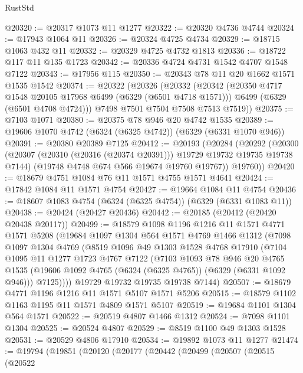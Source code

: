 \begin{lexlean}{RustStd}
\begin{coremodule}
{{@20320 := @20317 @1073 @11 @1277
@20322 := @20320 @4736 @4744
@20324 := @17943 @1064 @11
@20326 := @20324 @4725 @4734
@20329 := @18715 @1063 @432 @11
@20332 := @20329 @4725 @4732 @1813
@20336 := @18722 @117 @11 @135 @1723
@20342 := @20336 @4724 @4731 @1542 @4707 @1548 @7122
@20343 := @17956 @115
@20350 := @20343 @78 @11 @20 @1662 @1571 @1535 @1542
@20374 := @20322
    (@20326
      (@20332
        (@20342
          (@20350 @4717 @1548 @20105 @17968 @6499 (@6329 (@6501 @4718 @1571)))
          @6499
          (@6329 (@6501 @4708 @4724)))
        @7498
        @7501
        @7504
        @7508
        @7513
        @7519))
@20375 := @7103 @1071
@20380 := @20375 @78 @946 @20 @4742 @1535
@20389 := @19606 @1070 @4742 (@6324 (@6325 @4742)) (@6329 (@6331 @1070 @946))
@20391 := @20380 @20389 @7125
@20412 := @20193
    (@20284
      (@20292
        (@20300
          (@20307 (@20310 (@20316 (@20374 @20391))) @19729 @19732 @19735 @19738 @7144)
          (@19748 @4748 @674 @566 @19674 @19760 @19767))
        @19760))
@20420 := @18679 @4751 @1084 @76 @11 @1571 @4755 @1571 @4641
@20424 := @17842 @1084 @11 @1571 @4754
@20427 := @19664 @1084 @11 @4754
@20436 := @18607 @1083 @4754 (@6324 (@6325 @4754)) (@6329 (@6331 @1083 @11))
@20438 := @20424 (@20427 @20436)
@20442 := @20185 (@20412 (@20420 @20438 @20117))
@20499 := @18579
    @1098
    @1196
    @1216
    @11
    @1571
    @4771
    @1571
    @5208
    (@19684
      @1097
      @1304
      @564
      @1571
      @4769
      @1466
      @1312
      (@7098
        @1097
        @1304
        @4769
        (@8519
          @1096
          @49
          @1303
          @1528
          @4768
          @17910
          (@7104
            @1095
            @11
            @1277
            @1723
            @4767
            @7122
            (@7103
              @1093
              @78
              @946
              @20
              @4765
              @1535
              (@19606 @1092 @4765 (@6324 (@6325 @4765)) (@6329 (@6331 @1092 @946)))
              @7125))))
      @19729
      @19732
      @19735
      @19738
      @7144)
@20507 := @18679 @4771 @1196 @1216 @11 @1571 @5107 @1571 @5206
@20515 := @18579 @1102 @1163 @1195 @11 @1571 @4809 @1571 @5107
@20519 := @19684 @1101 @1304 @564 @1571
@20522 := @20519 @4807 @1466 @1312
@20524 := @7098 @1101 @1304
@20525 := @20524 @4807
@20529 := @8519 @1100 @49 @1303 @1528
@20531 := @20529 @4806 @17910
@20534 := @19892 @1073 @11 @1277
@21474 := @19794
    (@19851
      (@20120
        (@20177
          (@20442
            (@20499
              (@20507
                (@20515
                  (@20522
}}
\end{coremodule}
\end{lexlean}
